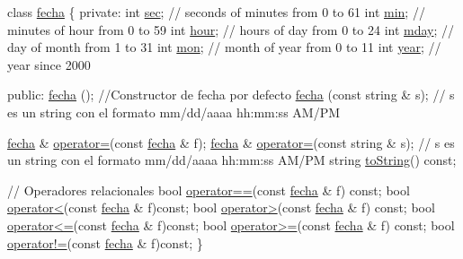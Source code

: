 \begin{DoxyCode}
\textcolor{keyword}{class }\hyperlink{classfecha}{fecha} \{
\textcolor{keyword}{private}:
  \textcolor{keywordtype}{int}  \hyperlink{classfecha_a09eb9f4865c9ff896f438b8df3cf6485}{sec};   \textcolor{comment}{// seconds of minutes from 0 to 61}
  \textcolor{keywordtype}{int}  \hyperlink{classfecha_a3875f28ff6e7c383923c80e86afaec2e}{min};   \textcolor{comment}{// minutes of hour from 0 to 59}
  \textcolor{keywordtype}{int}  \hyperlink{classfecha_a895a2cc9dd11326a8392a4c6fc928a14}{hour};  \textcolor{comment}{// hours of day from 0 to 24}
  \textcolor{keywordtype}{int}  \hyperlink{classfecha_a9c1dc50e5f5efcd3e30a981bfd495b1d}{mday};  \textcolor{comment}{// day of month from 1 to 31}
  \textcolor{keywordtype}{int}  \hyperlink{classfecha_a5c86be74f1215600f99798d54126ba16}{mon};   \textcolor{comment}{// month of year from 0 to 11}
  \textcolor{keywordtype}{int}  \hyperlink{classfecha_a4d06534f05a6350ae229ce2b17b860e8}{year};  \textcolor{comment}{// year since 2000}

\textcolor{keyword}{public}:
 \hyperlink{classfecha_a6775ef84b5838e12e28fd341793f4539}{fecha} (); \textcolor{comment}{//Constructor de fecha por defecto}
 \hyperlink{classfecha_a6775ef84b5838e12e28fd341793f4539}{fecha} (\textcolor{keyword}{const} \textcolor{keywordtype}{string} & s); \textcolor{comment}{// s es un string con el formato mm/dd/aaaa  hh:mm:ss AM/PM}

 \hyperlink{classfecha}{fecha} & \hyperlink{classfecha_ac7f5398b71cbccc4cd74f8c5e56b80ce}{operator=}(\textcolor{keyword}{const} \hyperlink{classfecha}{fecha} & f);
 \hyperlink{classfecha}{fecha} & \hyperlink{classfecha_ac7f5398b71cbccc4cd74f8c5e56b80ce}{operator=}(\textcolor{keyword}{const} \textcolor{keywordtype}{string} & s); \textcolor{comment}{// s es un string con el formato mm/dd/aaaa hh:mm:ss
       AM/PM}
 \textcolor{keywordtype}{string} \hyperlink{classfecha_a26d22b980284408eac0da084f358c43b}{toString}() \textcolor{keyword}{const};

\textcolor{comment}{// Operadores relacionales}
  \textcolor{keywordtype}{bool} \hyperlink{classfecha_ac971e131a6e3edf57c2313468524f364}{operator==}(\textcolor{keyword}{const} \hyperlink{classfecha}{fecha} & f) \textcolor{keyword}{const};
 \textcolor{keywordtype}{bool} \hyperlink{classfecha_a27803300b9698e1a40ef48f2009948c5}{operator<}(\textcolor{keyword}{const} \hyperlink{classfecha}{fecha} & f)\textcolor{keyword}{const};
 \textcolor{keywordtype}{bool} \hyperlink{classfecha_aaded7646e80d88492b31b17b4fb001fd}{operator>}(\textcolor{keyword}{const} \hyperlink{classfecha}{fecha} & f) \textcolor{keyword}{const};
 \textcolor{keywordtype}{bool} \hyperlink{classfecha_a8dfb2f2a7424bdb1dacc6df122b0a0c8}{operator<=}(\textcolor{keyword}{const} \hyperlink{classfecha}{fecha} & f)\textcolor{keyword}{const};
 \textcolor{keywordtype}{bool} \hyperlink{classfecha_a98d0f3009cb7205b5ddb3b81596d9cc7}{operator>=}(\textcolor{keyword}{const} \hyperlink{classfecha}{fecha} & f) \textcolor{keyword}{const};
 \textcolor{keywordtype}{bool} \hyperlink{classfecha_a1f6d28759c45b138efb80d25a7c398b8}{operator!=}(\textcolor{keyword}{const} \hyperlink{classfecha}{fecha} & f)\textcolor{keyword}{const};
\}


\end{DoxyCode}

